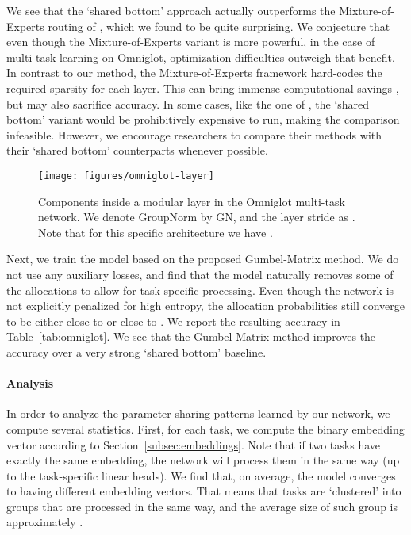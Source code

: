 \documentclass[conference]{IEEEtran}
\begin{document}
We see that the `shared bottom' approach actually outperforms the Mixture-of-Experts routing of \cite{Diversity&Depth-ICLR-2019}, which we found to be quite surprising. We conjecture that even though the Mixture-of-Experts variant is more powerful, in the case of multi-task learning on Omniglot, optimization difficulties outweigh that benefit. In contrast to our method, the Mixture-of-Experts framework hard-codes the required sparsity for each layer. This can bring immense computational savings \cite{Shazeer-MoE-2017}, but may also sacrifice accuracy. In some cases, like the one of \cite{Shazeer-MoE-2017}, the `shared bottom' variant would be prohibitively expensive to run, making the comparison infeasible. However, we encourage researchers to compare their methods with their `shared bottom' counterparts whenever possible.

\begin{figure}[t]
\begin{center}
\texttt{[image: figures/omniglot-layer]}
\end{center}
\caption{Components inside a modular layer in the Omniglot multi-task network. We denote GroupNorm by GN, and the layer stride as . Note that for this specific architecture we have .}\label{fig:omniglot-layer}
\end{figure}

Next, we train the model based on the proposed Gumbel-Matrix method. We do not use any auxiliary losses, and find that the model naturally removes some of the allocations to allow for task-specific processing. Even though the network is not explicitly penalized for high entropy, the allocation probabilities still converge to be either close to  or close to . We report the resulting accuracy in Table~\ref{tab:omniglot}. We see that the Gumbel-Matrix method improves the accuracy over a very strong `shared bottom' baseline.

\paragraph{Analysis}

In order to analyze the parameter sharing patterns learned by our network, we compute several statistics. First, for each task, we compute the binary embedding vector according to Section~\ref{subsec:embeddings}. Note that if two tasks have exactly the same embedding, the network will process them in the same way (up to the task-specific linear heads). We find that, on average, the model converges to having  different embedding vectors. That means that tasks are `clustered' into groups that are processed in the same way, and the average size of such group is approximately .
\end{document}
